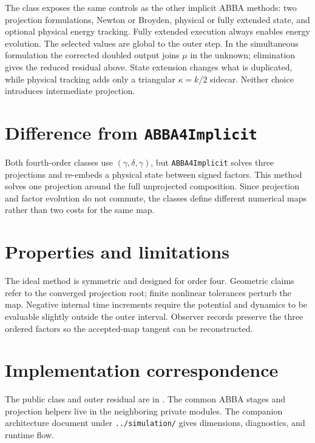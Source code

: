 \documentclass[11pt,a4paper]{article}
\begin{document}
The class exposes the same controls as the other implicit ABBA methods: two
projection formulations, Newton or Broyden, physical or fully extended state,
and optional physical energy tracking.  Fully extended execution always
enables energy evolution.  The selected values are global to the outer step.
In the simultaneous formulation the corrected doubled output joins $\mu$ in
the unknown; elimination gives the reduced residual above.  State extension
changes what is duplicated, while physical tracking adds only a triangular
$\kappa=k/2$ sidecar.  Neither choice introduces intermediate projection.

\section{Difference from \texttt{ABBA4Implicit}}

Both fourth-order classes use $(\gamma,\delta,\gamma)$, but
\texttt{ABBA4Implicit} solves three projections and re-embeds a physical state
between signed factors.  This method solves one projection around the full
unprojected composition.  Since projection and factor evolution do not
commute, the classes define different numerical maps rather than two costs for
the same map.

\section{Properties and limitations}

The ideal method is symmetric and designed for order four.  Geometric claims
refer to the converged projection root; finite nonlinear tolerances perturb the
map.  Negative internal time increments require the potential and dynamics to
be evaluable slightly outside the outer interval.  Observer records preserve
the three ordered factors so the accepted-map tangent can be reconstructed.

\section{Implementation correspondence}

The public class and outer residual are in
.
The common ABBA stages and projection helpers live in the neighboring private
modules.  The companion architecture document under \texttt{../simulation/}
gives dimensions, diagnostics, and runtime flow.
\end{document}

